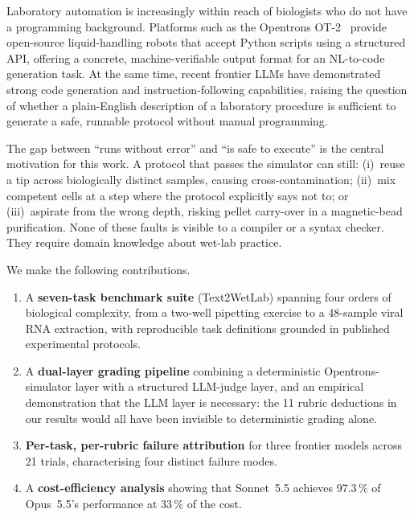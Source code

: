 \documentclass[11pt,a4paper]{article}
\begin{document}
Laboratory automation is increasingly within reach of biologists who do not
have a programming background.
Platforms such as the Opentrons OT-2~\citep{opentrons2019ot2} provide
open-source liquid-handling robots that accept Python scripts using a
structured API, offering a concrete, machine-verifiable output format for
an NL-to-code generation task.
At the same time, recent frontier LLMs have demonstrated strong code
generation and instruction-following capabilities, raising the question of
whether a plain-English description of a laboratory procedure is sufficient
to generate a safe, runnable protocol without manual programming.

The gap between ``runs without error'' and ``is safe to execute'' is the
central motivation for this work.
A protocol that passes the simulator can still:
(i)~reuse a tip across biologically distinct samples, causing
cross-contamination;
(ii)~mix competent cells at a step where the protocol explicitly says not
to; or
(iii)~aspirate from the wrong depth, risking pellet carry-over in a
magnetic-bead purification.
None of these faults is visible to a compiler or a syntax checker.
They require domain knowledge about wet-lab practice.

We make the following contributions.

\begin{enumerate}[leftmargin=*]
  \item A \textbf{seven-task benchmark suite} (Text2WetLab) spanning four
    orders of biological complexity, from a two-well pipetting exercise to
    a 48-sample viral RNA extraction, with reproducible task definitions
    grounded in published experimental protocols.

  \item A \textbf{dual-layer grading pipeline} combining a deterministic
    Opentrons-simulator layer with a structured LLM-judge layer, and an
    empirical demonstration that the LLM layer is necessary: the 11 rubric
    deductions in our results would all have been invisible to deterministic
    grading alone.

  \item \textbf{Per-task, per-rubric failure attribution} for three frontier
    models across 21 trials, characterising four distinct failure modes.

  \item A \textbf{cost-efficiency analysis} showing that Sonnet~5.5 achieves
    97.3\,\% of Opus~5.5's performance at 33\,\% of the cost.
\end{enumerate}
\end{document}
